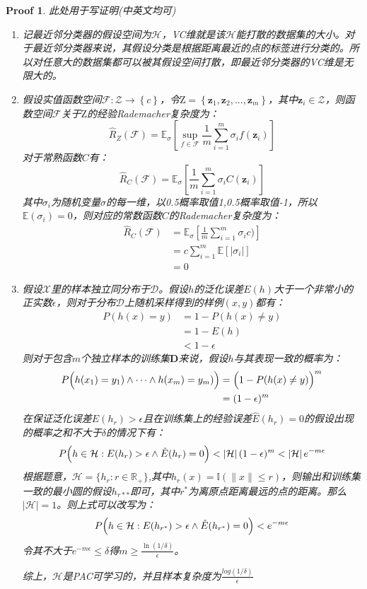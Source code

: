 \documentclass[a4paper,UTF8]{article}
\numberwithin{equation}{section}
\newtheorem*{myProof}{Proof}
\begin{document}
\begin{myProof}
此处用于写证明(中英文均可)

\begin{enumerate}[(1)]
	\item 记最近邻分类器的假设空间为$\mathcal{H}$，VC维就是该$\mathcal{H}$能打散的数据集的大小。对于最近邻分类器来说，其假设分类是根据距离最近的点的标签进行分类的。所以对任意大的数据集都可以被其假设空间打散，即最近邻分类器的VC维是无限大的。
	\item 假设实值函数空间$\mathcal{F}:\mathcal{Z}\rightarrow\left\{ c \right\}$，令$ \mathrm{Z} =\left\{ \boldsymbol{z}_1, \boldsymbol{z}_2, ..., \boldsymbol{z}_m \right\}$，其中$\boldsymbol{z}_i \in \mathcal{Z}$，则函数空间$\mathcal{F}$关于$\mathrm{Z}$的经验Rademacher复杂度为：
	\[ \hat{R}_Z(\mathcal{F})=\mathbb{E}_{\sigma}\left[ \sup\limits _{f\in\mathcal{F}} \frac{1}{m}\sum_{i=1}^m \sigma_{i}f(\boldsymbol{z}_i) \right] \]
	对于常熟函数$C$有：
	\[ \hat{R}_C(\mathcal{F})=\mathbb{E}_{\sigma}\left[ \frac{1}{m}\sum_{i=1}^m \sigma_{i}C(\boldsymbol{z}_i) \right] \]
	其中$\sigma_i$为随机变量$\sigma$的每一维，以0.5概率取值1,0.5概率取值-1，所以$\mathbb{E}(\sigma_i)=0$，则对应的常数函数$C$的Rademacher复杂度为：
	\[ \begin{aligned}
		\hat{R}_C(\mathcal{F}) &= \mathbb{E}_{\sigma}\left[ \frac{1}{m}\sum_{i=1}^m \sigma_{i}c) \right] \\
		&= c\sum_{i=1}^m \mathbb{E}\left[ \left| \sigma_i \right| \right] \\
		&= 0
	\end{aligned} \]
	\item 假设$\mathcal{X}$里的样本独立同分布于$\mathcal{D}$。假设$h$的泛化误差$E(h)$大于一个非常小的正实数$\epsilon$，则对于分布$\mathcal{D}$上随机采样得到的样例$(x, y)$都有：
	\[ \begin{aligned}
		P(h(x)=y) &= 1 - P(h(x)\neq y) \\
		&= 1 - E(h) \\
		&< 1 - \epsilon
	\end{aligned}\]
	则对于包含$m$个独立样本的训练集$\boldsymbol{D}$来说，假设$h$与其表现一致的概率为：
	\[ \begin{aligned}
		P\Bigl(h(x_1)=y_1)\land\cdots\land h(x_m)=y_m) \Bigr) &= \Bigl(1-P(h(x)\neq y)\Bigr)^m \\
		&= (1 - \epsilon)^m
	\end{aligned} \]
	在保证泛化误差$E(h_r)>\epsilon$且在训练集上的经验误差$\hat{E}(h_r)=0$的假设出现的概率之和不大于$\delta$的情况下有：
	\[ P\Bigl(h\in\mathcal{H}:E(h_r)>\epsilon\land\hat{E}(h_r)=0\Bigr) < \left|\mathcal{H}\right|(1-\epsilon)^m < \left|\mathcal{H}\right|e^{-m\epsilon}\]
	根据题意，$\mathcal{H}=\{h_r:r \in \mathbb{R}_+\}$,其中$h_r (x)=\mathbb{I}(\parallel x \parallel \leq r)$，则输出和训练集一致的最小圆的假设$h_{r**}$即可，其中$r^*$为离原点距离最远的点的距离。那么$\left|\mathcal{H}\right|=1$。则上式可以改写为：
	\[ P\Bigl(h\in\mathcal{H}:E(h_{r^*})>\epsilon\land\hat{E}(h_{r^*})=0\Bigr) < e^{-m\epsilon}\]
	令其不大于$e^{-m\epsilon}\leq\delta$得$m\ge\frac{\ln(1/\delta)}{\epsilon}$。

	综上，$\mathcal{H}$是PAC可学习的，并且样本复杂度为$\frac{log(1/\delta)}{\epsilon}$
\end{enumerate}

\end{myProof}
\end{document}
